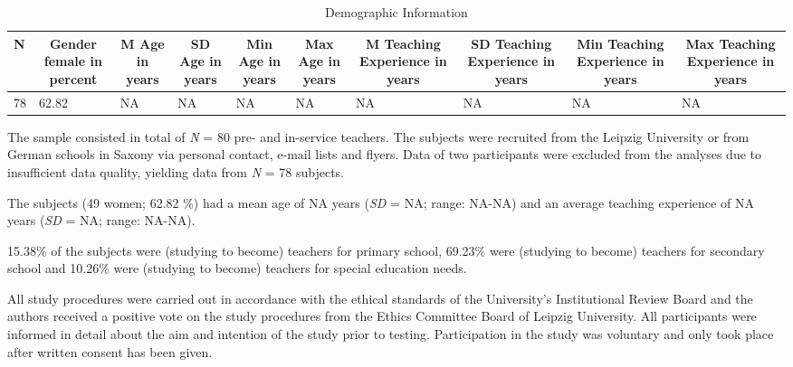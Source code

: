 \documentclass[
  man,floatsintext]{apa6}
\begin{document}
\begin{table}[h]

\begin{center}
\begin{threeparttable}

\caption{\label{tab:demographicstable}Demographic Information}

\tiny{

\begin{tabular}{llllllllll}
\toprule
N & \multicolumn{1}{c}{Gender female in percent} & \multicolumn{1}{c}{M Age in years} & \multicolumn{1}{c}{SD Age in years} & \multicolumn{1}{c}{Min Age in years} & \multicolumn{1}{c}{Max Age in years} & \multicolumn{1}{c}{M Teaching Experience in years} & \multicolumn{1}{c}{SD Teaching Experience in years} & \multicolumn{1}{c}{Min Teaching Experience in years} & \multicolumn{1}{c}{Max Teaching Experience in years}\\
\midrule
78 & 62.82 & NA & NA & NA & NA & NA & NA & NA & NA\\
\bottomrule
\end{tabular}

}

\end{threeparttable}
\end{center}

\end{table}

The sample consisted in total of \emph{N} = 80 pre- and in-service teachers. The subjects were recruited from the Leipzig University or from German schools in Saxony via personal contact, e-mail lists and flyers. Data of two participants were excluded from the analyses due to insufficient data quality, yielding data from \emph{N} = 78 subjects.

The subjects (49 women; 62.82 \%) had a mean age of NA years (\emph{SD} = NA; range: NA-NA) and an average teaching experience of NA years (\emph{SD} = NA; range: NA-NA).

15.38\% of the subjects were (studying to become) teachers for primary school, 69.23\% were (studying to become) teachers for secondary school and 10.26\% were (studying to become) teachers for special education needs.

All study procedures were carried out in accordance with the ethical standards of the University's Institutional Review Board and the authors received a positive vote on the study procedures from the Ethics Committee Board of Leipzig University. All participants were informed in detail about the aim and intention of the study prior to testing. Participation in the study was voluntary and only took place after written consent has been given.
\end{document}
